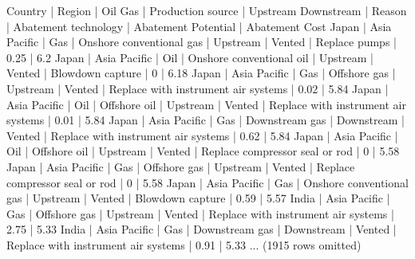 \documentclass[letterpaper,10pt,english]{jupyterBook}
\begin{document}
\begin{sphinxVerbatim}[commandchars=\\\{\}]
Country | Region       | Oil Gas | Production source        | Upstream Downstream | Reason | Abatement technology                | Abatement Potential | Abatement Cost
Japan   | Asia Pacific | Gas     | Onshore conventional gas | Upstream            | Vented | Replace pumps                       | 0.25                | \PYGZhy{}6.2
Japan   | Asia Pacific | Oil     | Onshore conventional oil | Upstream            | Vented | Blowdown capture                    | 0                   | \PYGZhy{}6.18
Japan   | Asia Pacific | Gas     | Offshore gas             | Upstream            | Vented | Replace with instrument air systems | 0.02                | \PYGZhy{}5.84
Japan   | Asia Pacific | Oil     | Offshore oil             | Upstream            | Vented | Replace with instrument air systems | 0.01                | \PYGZhy{}5.84
Japan   | Asia Pacific | Gas     | Downstream gas           | Downstream          | Vented | Replace with instrument air systems | 0.62                | \PYGZhy{}5.84
Japan   | Asia Pacific | Oil     | Offshore oil             | Upstream            | Vented | Replace compressor seal or rod      | 0                   | \PYGZhy{}5.58
Japan   | Asia Pacific | Gas     | Offshore gas             | Upstream            | Vented | Replace compressor seal or rod      | 0                   | \PYGZhy{}5.58
Japan   | Asia Pacific | Gas     | Onshore conventional gas | Upstream            | Vented | Blowdown capture                    | 0.59                | \PYGZhy{}5.57
India   | Asia Pacific | Gas     | Offshore gas             | Upstream            | Vented | Replace with instrument air systems | 2.75                | \PYGZhy{}5.33
India   | Asia Pacific | Gas     | Downstream gas           | Downstream          | Vented | Replace with instrument air systems | 0.91                | \PYGZhy{}5.33
... (1915 rows omitted)
\end{sphinxVerbatim}
\end{document}
